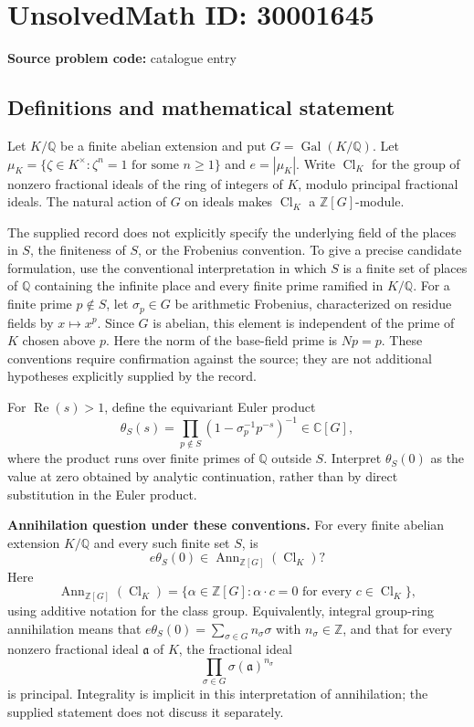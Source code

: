 \documentclass[11pt]{article}
\newcommand{\Z}{\mathbb{Z}}
\newcommand{\Q}{\mathbb{Q}}
\newcommand{\C}{\mathbb{C}}
\begin{document}
\section*{UnsolvedMath ID: 30001645}
\textbf{Source problem code:} catalogue entry
\subsection{Definitions and mathematical statement}
Let \(K/\Q\) be a finite abelian extension and put \(G=\operatorname{Gal}(K/\Q)\). Let \(\mu_K=\{\zeta\in K^\times:\zeta^n=1\text{ for some }n\geq1\}\) and \(e=|\mu_K|\). Write \(\operatorname{Cl}_K\) for the group of nonzero fractional ideals of the ring of integers of \(K\), modulo principal fractional ideals. The natural action of \(G\) on ideals makes \(\operatorname{Cl}_K\) a \(\Z[G]\)-module.

The supplied record does not explicitly specify the underlying field of the places in \(S\), the finiteness of \(S\), or the Frobenius convention. To give a precise candidate formulation, use the conventional interpretation in which \(S\) is a finite set of places of \(\Q\) containing the infinite place and every finite prime ramified in \(K/\Q\). For a finite prime \(p\notin S\), let \(\sigma_p\in G\) be arithmetic Frobenius, characterized on residue fields by \(x\mapsto x^p\). Since \(G\) is abelian, this element is independent of the prime of \(K\) chosen above \(p\). Here the norm of the base-field prime is \(Np=p\). These conventions require confirmation against the source; they are not additional hypotheses explicitly supplied by the record.

For \(\operatorname{Re}(s)>1\), define the equivariant Euler product
\[
\theta_S(s)=\prod_{p\notin S}\left(1-\sigma_p^{-1}p^{-s}\right)^{-1}\in\C[G],
\]
where the product runs over finite primes of \(\Q\) outside \(S\). Interpret \(\theta_S(0)\) as the value at zero obtained by analytic continuation, rather than by direct substitution in the Euler product.

\textbf{Annihilation question under these conventions.} For every finite abelian extension \(K/\Q\) and every such finite set \(S\), is
\[
 e\theta_S(0)\in\operatorname{Ann}_{\Z[G]}(\operatorname{Cl}_K)?
\]
Here
\[
\operatorname{Ann}_{\Z[G]}(\operatorname{Cl}_K)
=\{\alpha\in\Z[G]:\alpha\cdot c=0\text{ for every }c\in\operatorname{Cl}_K\},
\]
using additive notation for the class group. Equivalently, integral group-ring annihilation means that \(e\theta_S(0)=\sum_{\sigma\in G}n_\sigma\sigma\) with \(n_\sigma\in\Z\), and that for every nonzero fractional ideal \(\mathfrak a\) of \(K\), the fractional ideal
\[
\prod_{\sigma\in G}\sigma(\mathfrak a)^{n_\sigma}
\]
is principal. Integrality is implicit in this interpretation of annihilation; the supplied statement does not discuss it separately.
\end{document}
